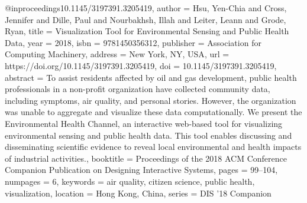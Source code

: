 @inproceedings{10.1145/3197391.3205419,
author = {Hsu, Yen-Chia and Cross, Jennifer and Dille, Paul and Nourbakhsh, Illah and Leiter, Leann and Grode, Ryan},
title = {Visualization Tool for Environmental Sensing and Public Health Data},
year = {2018},
isbn = {9781450356312},
publisher = {Association for Computing Machinery},
address = {New York, NY, USA},
url = {https://doi.org/10.1145/3197391.3205419},
doi = {10.1145/3197391.3205419},
abstract = {To assist residents affected by oil and gas development, public health professionals in a non-profit organization have collected community data, including symptoms, air quality, and personal stories. However, the organization was unable to aggregate and visualize these data computationally. We present the Environmental Health Channel, an interactive web-based tool for visualizing environmental sensing and public health data. This tool enables discussing and disseminating scientific evidence to reveal local environmental and health impacts of industrial activities.},
booktitle = {Proceedings of the 2018 ACM Conference Companion Publication on Designing Interactive Systems},
pages = {99–104},
numpages = {6},
keywords = {air quality, citizen science, public health, visualization},
location = {Hong Kong, China},
series = {DIS '18 Companion}
}